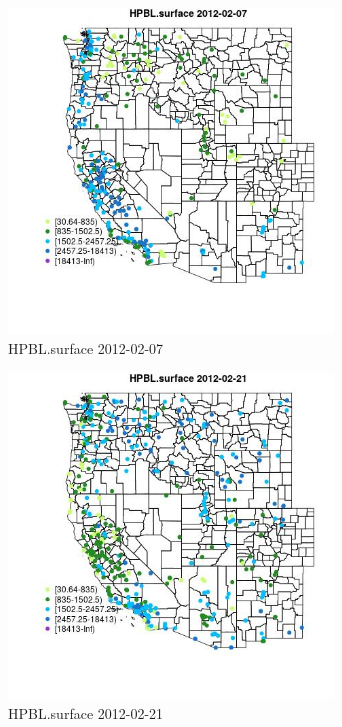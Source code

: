 \begin{figure} 
\centering  
\includegraphics[width=0.77\textwidth]{Code_Outputs/Report_ML_input_PM25_Step4_part_f_de_duplicated_aveswNAs_MapObsHPBLsurface2012-02-07.jpg} 
\caption{\label{fig:Report_ML_input_PM25_Step4_part_f_de_duplicated_aveswNAsMapObsHPBLsurface2012-02-07}HPBL.surface 2012-02-07} 
\end{figure} 
 

\begin{figure} 
\centering  
\includegraphics[width=0.77\textwidth]{Code_Outputs/Report_ML_input_PM25_Step4_part_f_de_duplicated_aveswNAs_MapObsHPBLsurface2012-02-21.jpg} 
\caption{\label{fig:Report_ML_input_PM25_Step4_part_f_de_duplicated_aveswNAsMapObsHPBLsurface2012-02-21}HPBL.surface 2012-02-21} 
\end{figure} 
 

